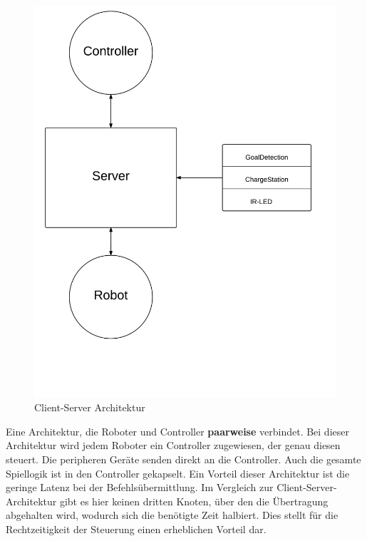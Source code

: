 \begin{figure}[!h]
	\includegraphics[scale=0.25]{images/client-server_architektur.pdf}
	\caption{Client-Server Architektur}
	\label{fig:client-server_architektur}
\end{figure}


Eine Architektur, die Roboter und Controller \textbf{paarweise} verbindet. Bei dieser Architektur wird jedem Roboter ein Controller zugewiesen, der genau diesen steuert. Die peripheren Geräte senden direkt an die Controller. Auch die gesamte Spiellogik ist in den Controller gekapselt. Ein Vorteil dieser Architektur ist die geringe Latenz bei der Befehlsübermittlung. Im Vergleich zur Client-Server-Architektur gibt es hier keinen dritten Knoten, über den die Übertragung abgehalten wird, wodurch sich die benötigte Zeit halbiert. Dies stellt für die Rechtzeitigkeit der Steuerung einen erheblichen Vorteil dar.

